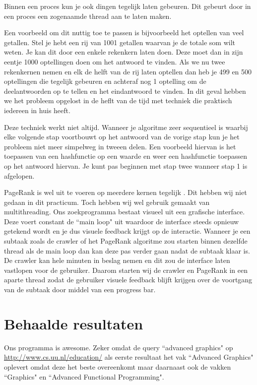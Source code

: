 \documentclass[12pt,a4paper]{article}
\begin{document}
Binnen een proces kun je ook dingen tegelijk laten gebeuren. Dit gebeurt door in een proces een zogenaamde thread aan te laten maken. 
\vspace{1pc}

Een voorbeeld om dit nuttig toe te passen is bijvoorbeeld het optellen van veel getallen. Stel je hebt een rij van 1001 getallen waarvan je de totale som wilt weten. Je kan dit door een enkele rekenkern laten doen. Deze moet dan in zijn eentje 1000 optellingen doen om het antwoord te vinden.
Als we nu twee rekenkernen nemen en elk de helft van de rij laten optellen dan heb je 499 en 500 optellingen die tegelijk gebeuren en achteraf nog 1 optelling om de deelantwoorden op te tellen en het eindantwoord te vinden. In dit geval hebben we het probleem opgelost in de heflt van de tijd met techniek die praktisch iedereen in huis heeft.
\vspace{1pc}

Deze techniek werkt niet altijd. Wanneer je algoritme zeer sequentieel is waarbij elke volgende stap voortbouwt op het antwoord van de vorige stap kun je het probleem niet meer simpelweg in tweeen delen. Een voorbeeld hiervan is het toepassen van een hashfunctie op een waarde en weer een hashfunctie toepassen op het antwoord hiervan. Je kunt pas beginnen met stap twee wanneer stap 1 is afgelopen.
\vspace{1pc}

PageRank is wel uit te voeren op meerdere kernen tegelijk \cite{4}. Dit hebben wij niet gedaan in dit practicum. Toch hebben wij wel gebruik gemaakt van multithreading.
Ons zoekprogramma bestaat visueel uit een grafische interface. Deze voert constant de ``main loop" uit waardoor de interface steeds opnieuw getekend wordt en je dus visuele feedback krijgt op de interactie. Wanneer je een subtaak zoals de crawler of het PageRank algoritme zou starten binnen dezelfde thread als de main loop dan kan deze pas verder gaan nadat de subtaak klaar is. De crawler kan hele minuten in beslag nemen en dit zou de interface laten vastlopen voor de gebruiker.
Daarom starten wij de crawler en PageRank in een aparte thread zodat de gebruiker visuele feedback blijft krijgen over de voortgang van de subtaak door middel van een progress bar.

\section{Behaalde resultaten}
Ons programma is awesome. Zeker omdat de query ``advanced graphics" op \url{http://www.cs.uu.nl/education/} als eerste resultaat het vak ``Advanced Graphics" oplevert omdat deze het beste overeenkomt maar daarnaast ook de vakken ``Graphics" en ``Advanced Functional Programming".
\end{document}
